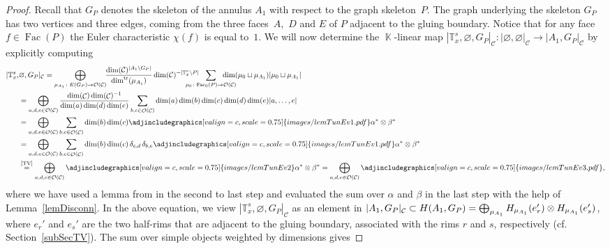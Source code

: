 \documentclass[10pt,a4paper]{amsart}
\DeclareMathOperator{\tr}{tr}
\DeclareMathOperator{\K}{\mathbb{K}}
\DeclareMathOperator{\calc}{\mathcal{C}}
\DeclareMathOperator{\calo}{\mathcal{O}}
\DeclareMathOperator{\Fac}{\mathrm{Fac}}
\numberwithin{equation}{section}
\theoremstyle{definition}
\begin{document}
\begin{proof}
 Recall that $G_P$ denotes the skeleton of the annulus $A_1$ with respect to the graph skeleton~$P$. The graph underlying the skeleton $G_P$ has two vertices and three edges, coming from the three faces~$A$,~$D$ and $E$ of $P$ adjacent to the gluing boundary. Notice that for any face $f \in \Fac(P)$ the Euler characteristic $\chi(f)$ is equal to~$1$. We will now determine the $\K$-linear map $|\mathbb{T}_x^s, \varnothing, G_P|_{\mathcal{C}}\colon |\varnothing, \varnothing|_{\calc} \rightarrow |A_1, G_P|_{\calc}$ by explicitly computing
 \begin{align}
 \label{eqGenTunPrep}
 |\mathbb{T}_x^s, &\varnothing, G_P|_{\mathcal{C}} = \bigoplus_{\mu_{A_1} \colon E(G_P) \rightarrow \mathcal{O}(\mathcal{C})}\!\!\frac{\dim(\mathcal{C})^{|A_1\setminus G_P|}}{\dim^{\tr}(\mu_{A_1})}\dim(\mathcal{C})^{-|\mathbb{T}_x^s\setminus P|} \!\!\! \!\!\!\!\!\!\!\!\! \sum_{\mu_0\colon \mathrm{Fac}_{0}(P) \rightarrow \mathcal{O}(\mathcal{C})} \!\!\!\!\!\! \!\!\! \!\!\!\dim(\mu_0 \sqcup \mu_{A_1})|\mu_0 \sqcup \mu_{A_1}| \nonumber \\
 &= \bigoplus_{a, d, e \in \mathcal{O}(\mathcal{C})} \frac{\dim(\calc)\dim(\calc)^{-1}}{\dim(a) \dim(d) \dim(e)} \sum_{b, c \in \calo(\calc)} \dim(a)\dim(b)\dim(c)\dim(d)\dim(e) |a, \dots, e| \nonumber \\
 &= \bigoplus_{a, d, e \in \mathcal{O}(\mathcal{C})}\sum_{b, c \in \calo(\calc)} \dim(b) \dim(c) \adjincludegraphics[valign=c, scale = 0.75]{images/lemTunEv1.pdf} \alpha^* \otimes \beta^* \nonumber \\
 &= \bigoplus_{a, d, e \in \mathcal{O}(\mathcal{C})}\sum_{b, c \in \calo(\calc)} \dim(b) \dim(c) \, \delta_{c,d} \, \delta_{b,e} \adjincludegraphics[valign=c, scale = 0.75]{images/lemTunEv1.pdf}\alpha^* \otimes \beta^* \nonumber \\
 &\overset{\text{\cite[Lemma 12.3]{TV}}}{=} \bigoplus_{a, d, e \in \mathcal{O}(\mathcal{C})} \adjincludegraphics[valign=c, scale = 0.75]{images/lemTunEv2}\alpha^* \otimes \beta^* = \bigoplus_{a, d, e \in \mathcal{O}(\mathcal{C})} \adjincludegraphics[valign=c, scale = 0.75]{images/lemTunEv3.pdf},
 \end{align}
 where we have used a lemma from \cite{TV} in the second to last step and evaluated the sum over $\alpha$ and $\beta$ in the last step with the help of Lemma~\ref{lemDisconn}. In the above equation, we view $|\mathbb{T}_x^s, \varnothing, G_P|_{\mathcal{C}}$ as an element in $|A_1, G_P|_{\calc} \subset H(A_1, G_P) = \smash{\bigoplus_{\mu_{A_1}}H_{\mu_{A_1}}(e_r') \otimes H_{\mu_{A_1}}(e_s')}$, where $e_r'$ and $e_s'$ are the two half-rims that are adjacent to the gluing boundary, associated with the rims $r$ and $s$, respectively (cf. Section~\ref{subSecTV}). The sum over simple objects weighted by dimensions gives

\end{proof}
\end{document}
